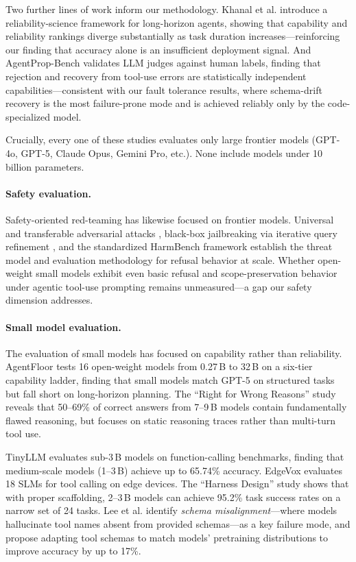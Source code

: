 Two further lines of work inform our methodology. Khanal et al. \cite{khanal2026longhorizon} introduce a reliability-science framework for long-horizon agents, showing that capability and reliability rankings diverge substantially as task duration increases---reinforcing our finding that accuracy alone is an insufficient deployment signal. And AgentProp-Bench \cite{gurram2026agentprop} validates LLM judges against human labels, finding that rejection and recovery from tool-use errors are statistically independent capabilities---consistent with our fault tolerance results, where schema-drift recovery is the most failure-prone mode and is achieved reliably only by the code-specialized model.

Crucially, every one of these studies evaluates only large frontier models (GPT-4o, GPT-5, Claude Opus, Gemini Pro, etc.). None include models under 10 billion parameters.

\paragraph{Safety evaluation.}
Safety-oriented red-teaming has likewise focused on frontier models. Universal and transferable adversarial attacks \cite{zou2023adversarial}, black-box jailbreaking via iterative query refinement \cite{chao2024jailbreaking}, and the standardized HarmBench framework \cite{mazeika2024harmbench} establish the threat model and evaluation methodology for refusal behavior at scale. Whether open-weight small models exhibit even basic refusal and scope-preservation behavior under agentic tool-use prompting remains unmeasured---a gap our safety dimension addresses.

\paragraph{Small model evaluation.}
The evaluation of small models has focused on capability rather than reliability. AgentFloor \cite{karmakar2026agentfloor} tests 16 open-weight models from 0.27\,B to 32\,B on a six-tier capability ladder, finding that small models match GPT-5 on structured tasks but fall short on long-horizon planning. The ``Right for Wrong Reasons'' study \cite{right2026wrong} reveals that 50--69\% of correct answers from 7--9\,B models contain fundamentally flawed reasoning, but focuses on static reasoning traces rather than multi-turn tool use.

TinyLLM \cite{tinyllm2026edge} evaluates sub-3\,B models on function-calling benchmarks, finding that medium-scale models (1--3\,B) achieve up to 65.74\% accuracy. EdgeVox \cite{edgevox2026} evaluates 18 SLMs for tool calling on edge devices. The ``Harness Design'' study \cite{cho2026harness} shows that with proper scaffolding, 2--3\,B models can achieve 95.2\% task success rates on a narrow set of 24 tasks. Lee et al. \cite{lee2025patool} identify \emph{schema misalignment}---where models hallucinate tool names absent from provided schemas---as a key failure mode, and propose adapting tool schemas to match models' pretraining distributions to improve accuracy by up to 17\%.

